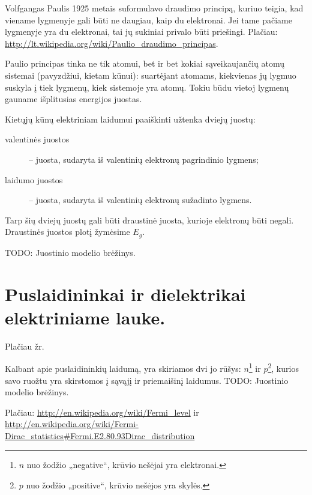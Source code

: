 Volfgangas Paulis 1925 metais suformulavo draudimo principą, kuriuo
teigia, kad viename lygmenyje gali būti ne daugiau, kaip du elektronai.
Jei tame pačiame lygmenyje yra du elektronai, tai jų sukiniai privalo
būti priešingi. Plačiau:
\url{http://lt.wikipedia.org/wiki/Paulio_draudimo_principas}.

Paulio principas tinka ne tik atomui, bet ir bet kokiai sąveikaujančių
atomų sistemai (pavyzdžiui, kietam kūnui): suartėjant atomams, kiekvienas
jų lygmuo suskyla į tiek lygmenų, kiek sistemoje yra atomų. Tokiu
būdu vietoj lygmenų gauname išplitusias energijos juostas.

Kietųjų kūnų elektriniam laidumui paaiškinti užtenka dviejų juostų:
\begin{description}
  \item[valentinės juostos] – juosta, sudaryta iš valentinių elektronų
    pagrindinio lygmens;
  \item[laidumo juostos] – juosta, sudaryta iš valentinių elektronų
    sužadinto lygmens.
\end{description}
Tarp šių dviejų juostų gali būti draustinė juosta, kurioje elektronų
būti negali. Draustinės juostos plotį žymėsime $E_{g}$.

TODO: Juostinio modelio brėžinys.

\section{Puslaidininkai ir dielektrikai elektriniame lauke.}

Plačiau žr. \cite[56p.]{elektra-magnetizmas}

Kalbant apie puslaidininkių laidumą, yra skiriamos dvi jo rūšys:
$n$\footnote{$n$ nuo žodžio „negative“, krūvio nešėjai yra elektronai.}
ir $p$\footnote{$p$ nuo žodžio „positive“, krūvio nešėjos yra skylės.},
kurios savo ruožtu yra skirstomos į sąvąjį ir priemaišinį
laidumus. TODO: Juostinio modelio brėžinys.

Plačiau: \url{http://en.wikipedia.org/wiki/Fermi_level} ir
\url{http://en.wikipedia.org/wiki/Fermi-Dirac_statistics#Fermi.E2.80.93Dirac_distribution}

